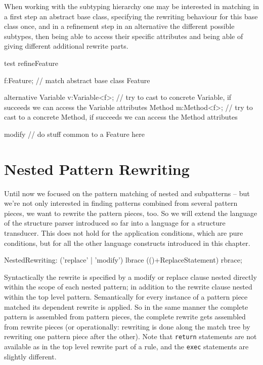 \begin{example} \label{ex:retypelhs}
When working with the subtyping hierarchy one may be interested in matching in a first step an abstract base class,
specifying the rewriting behaviour for this base class once,
and in a refinement step in an alternative the different possible subtypes, 
then being able to access their specific attributes and being able of giving different additional rewrite parts.
	\begin{grgen}
test refineFeature
{
  f:Feature; // match abstract base class Feature

  alternative {
    Variable {
      v:Variable<f>; // try to cast to concrete Variable, if succeeds we can access the Variable attributes
    }
    Method {
      m:Method<f>; // try to cast to a concrete Method, if succeeds we can access the Method attributes
    }
  }
  
  modify {
    // do stuff common to a Feature here
  }
}
	\end{grgen}
\end{example}


\section{Nested Pattern Rewriting}
\label{sec:nestedrewrite}

Until now we focused on the pattern matching of nested and subpatterns -- but we're not only interested in finding patterns combined from several pattern pieces, we want to rewrite the pattern pieces, too.
So we will extend the language of the structure parser introduced so far into a language for a structure transducer.
This does not hold for the application conditions, which are pure conditions, but for all the other language constructs introduced in this chapter.

\begin{rail}  
  NestedRewriting: ('replace' | 'modify') lbrace (()+ReplaceStatement) rbrace;
\end{rail}

Syntactically the rewrite is specified by a modify or replace clause nested directly within the scope of each nested pattern;
in addition to the rewrite clause nested within the top level pattern.
Semantically for every instance of a pattern piece matched its dependent rewrite is applied. 
So in the same manner the complete pattern is assembled from pattern pieces, the complete rewrite gets assembled from rewrite pieces
(or operationally: rewriting is done along the match tree by rewriting one pattern piece after the other).
Note that \texttt{return} statements are not available as in the top level rewrite part of a rule, and the \texttt{exec} statements are slightly different.

